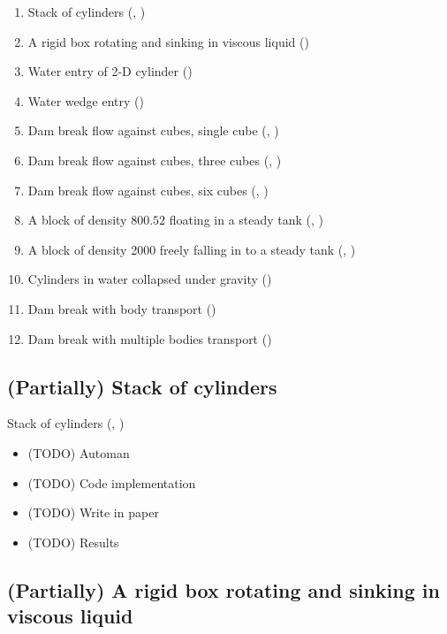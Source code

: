 \documentclass[preprint,12pt]{elsarticle}
\begin{document}
\begin{enumerate}
\item Stack of cylinders (\citet{canelas2016sph}, \citet{wang2019numerical})
\item A rigid box rotating and sinking in viscous liquid
  (\citet{sun2015numerical})
\item Water entry of 2-D cylinder (\citet{sun2015numerical})
\item Water wedge entry (\citet{sun2015numerical})
\item Dam break flow against cubes, single cube (\citet{canelas2016sph},
  \citet{ji2019coupled})
\item Dam break flow against cubes, three cubes (\citet{canelas2016sph},
  \citet{ji2019coupled})
\item Dam break flow against cubes, six cubes (\citet{canelas2016sph},
  \citet{ji2019coupled})
\item A block of density $800.52$ floating in a steady tank
  (\citet{qiu20173d}, \citet{wang2019numerical})
\item A block of density 2000 freely falling in to a steady tank
  (\citet{qiu20173d}, \citet{wang2019numerical})
\item Cylinders in water collapsed under gravity (\citet{chen2019coupled})
\item Dam break with body transport (\citet{wang2019numerical})
\item Dam break with multiple bodies transport (\citet{wang2019numerical})
\end{enumerate}


%
\subsection{(Partially) Stack of cylinders}

Stack of cylinders (\citet{canelas2016sph}, \citet{wang2019numerical})

\begin{itemize}
\item (TODO) Automan
\item (TODO) Code implementation
\item (TODO) Write in paper
\item (TODO) Results
\end{itemize}
%
\subsection{(Partially) A rigid box rotating and sinking in viscous liquid}
\end{document}
